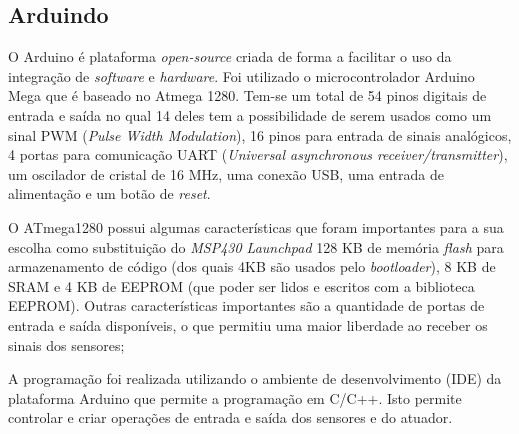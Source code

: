 \subsection{Arduindo}
\label{sec:arduino}

O Arduino é plataforma \textit{open-source} criada de forma a facilitar o uso da integração de \textit{software} e \textit{hardware}. Foi utilizado o microcontrolador Arduino Mega que é baseado no Atmega 1280. Tem-se um total de 54 pinos digitais de entrada e saída no qual 14 deles tem a possibilidade de serem usados como um sinal PWM (\textit{Pulse Width Modulation}), 16 pinos para entrada de sinais analógicos, 4 portas para comunicação UART (\textit{Universal asynchronous receiver/transmitter}), um oscilador de cristal de 16 MHz, uma conexão USB, uma entrada de alimentação e um botão de \textit{reset}.

O ATmega1280 possui algumas características que foram importantes para a sua escolha como substituição do \textit{MSP430 Launchpad} 128 KB de memória \textit{flash} para armazenamento de código (dos quais 4KB são usados pelo \textit{bootloader}), 8 KB de SRAM e 4 KB de EEPROM (que poder ser lidos e escritos com a biblioteca EEPROM). Outras características importantes são a quantidade de portas de entrada e saída disponíveis, o que permitiu uma maior liberdade ao receber os sinais dos sensores; 

A programação foi realizada utilizando o ambiente de desenvolvimento (IDE) da plataforma Arduino que permite a programação em C/C++. Isto permite controlar e criar operações de entrada e saída dos sensores e do atuador.

